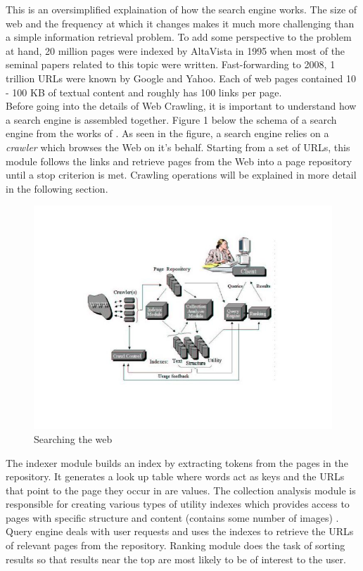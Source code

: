 \documentclass[a4paper, 11pt]{article} %
\begin{document}
This is an oversimplified explaination of how the search engine works. The size of web and the frequency at which it changes makes it much more challenging than a simple information retrieval problem. To add some perspective to the problem at hand, 20 million pages were indexed by AltaVista in 1995 when most of the seminal papers related to this topic were written. Fast-forwarding to 2008, 1 trillion URLs were known by Google and Yahoo. Each of web pages contained 10 - 100 KB of textual content and roughly has 100 links per page. \cite{stats2008st} \\ 

Before going into the details of Web Crawling, it is important to understand how a search engine is assembled together. Figure 1 below the schema of a search engine from the works of \cite{arasu2001searching}. As seen in the figure, a search engine relies on a \textit{crawler} which browses the Web on it's behalf. Starting from a set of URLs, this module follows the links and retrieve pages from the Web into a page repository until a stop criterion is met. Crawling operations will be explained in more detail in the following section. \\

\begin{figure} %
\begin{center}
\includegraphics[width=1\textwidth]{searchengine.jpg}
\end{center}
\caption{Searching the web}
\end{figure}

The indexer module builds an index by extracting tokens from the pages in the repository. It generates a look up table where words act as keys and the URLs that point to the page they occur in are values. The collection analysis module is responsible for creating various types of utility indexes which provides access to pages with specific structure and content (contains some number of images) \cite{arasu2001searching}. Query engine deals with user requests and uses the indexes to retrieve the URLs of relevant pages from the repository. Ranking module does the task of sorting results so that results near the top are most likely to be of interest to the user. \\
\end{document}
